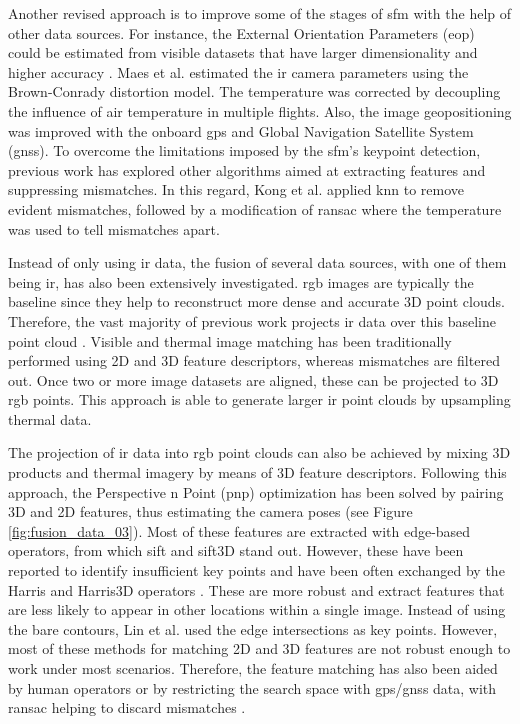 Another revised approach is to improve some of the stages of \acrshort{sfm} with the help of other data sources. For instance, the External Orientation Parameters (\acrshort{eop}) could be estimated from visible datasets that have larger dimensionality and higher accuracy \cite{jo_dense_2021}. Maes et al. \cite{maes_optimizing_2017} estimated the \acrshort{ir} camera parameters using the Brown-Conrady distortion model. The temperature was corrected by decoupling the influence of air temperature in multiple flights. Also, the image geopositioning was improved with the onboard \acrshort{gps} and Global Navigation Satellite System (\acrshort{gnss}). To overcome the limitations imposed by the \acrshort{sfm}'s keypoint detection, previous work has explored other algorithms aimed at extracting features and suppressing mismatches. In this regard, Kong et al. \cite{kong_3-d_2018} applied \acrshort{knn} to remove evident mismatches, followed by a modification of \acrshort{ransac} where the temperature was used to tell mismatches apart. 

Instead of only using \acrshort{ir} data, the fusion of several data sources, with one of them being \acrshort{ir}, has also been extensively investigated. \acrshort{rgb} images are typically the baseline since they help to reconstruct more dense and accurate 3D point clouds. Therefore, the vast majority of previous work projects \acrshort{ir} data over this baseline point cloud \cite{hosoi_estimating_2019, javadnejad_photogrammetric_2020}. Visible and thermal image matching has been traditionally performed using 2D and 3D feature descriptors, whereas mismatches are filtered out. Once two or more image datasets are aligned, these can be projected to 3D \acrshort{rgb} points. This approach is able to generate larger \acrshort{ir} point clouds by upsampling thermal data. 

The projection of \acrshort{ir} data into \acrshort{rgb} point clouds can also be achieved by mixing 3D products and thermal imagery by means of 3D feature descriptors. Following this approach, the Perspective n Point (\acrshort{pnp}) optimization has been solved by pairing 3D and 2D features, thus estimating the camera poses (see Figure \ref{fig:fusion_data_03}). Most of these features are extracted with edge-based operators, from which \acrshort{sift} and \acrshort{sift}3D stand out. However, these have been reported to identify insufficient key points and have been often exchanged by the Harris and Harris3D operators \cite{zhu_fusion_2021, zhu_direct_2019}. These are more robust and extract features that are less likely to appear in other locations within a single image. Instead of using the bare contours, Lin et al. \cite{lin_fusion_2019} used the edge intersections as key points. However, most of these methods for matching 2D and 3D features are not robust enough to work under most scenarios. Therefore, the feature matching has also been aided by human operators \cite{zhu_fusion_2021, zhu_direct_2019} or by restricting the search space with \acrshort{gps}/\acrshort{gnss} data, with \acrshort{ransac} helping to discard mismatches \cite{lin_fusion_2019}. 

